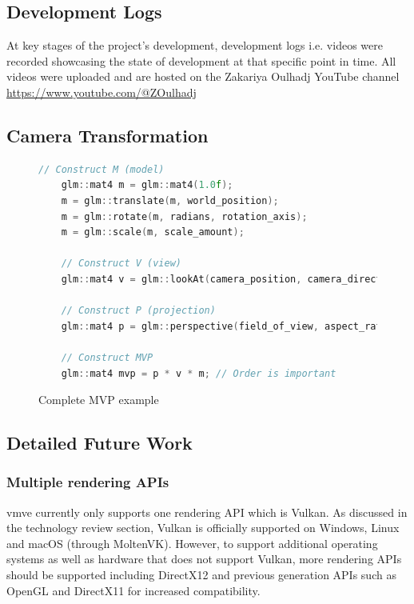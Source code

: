 \documentclass[11pt]{article}
\begin{document}
\subsection{Development Logs}
At key stages of the project's development, development logs i.e. videos were
recorded showcasing the state of development at that specific point in time. All
videos were uploaded and are hosted on the Zakariya Oulhadj YouTube channel
\url{https://www.youtube.com/@ZOulhadj}

\subsection{Camera Transformation}
\begin{figure}[H]
  \centering
  \begin{lstlisting}[language=C++]
    // Construct M (model)
    glm::mat4 m = glm::mat4(1.0f);
    m = glm::translate(m, world_position);   
    m = glm::rotate(m, radians, rotation_axis); 
    m = glm::scale(m, scale_amount);

    // Construct V (view)
    glm::mat4 v = glm::lookAt(camera_position, camera_direction, camera_up);

    // Construct P (projection)
    glm::mat4 p = glm::perspective(field_of_view, aspect_ratio, near, far);

    // Construct MVP
    glm::mat4 mvp = p * v * m; // Order is important

  \end{lstlisting}
  \caption{Complete MVP example}
  \label{fig:local_to_world_appendix}
\end{figure}

\subsection{Detailed Future Work} \label{detailed_future_work}

\subsubsection{Multiple rendering APIs}
\gls*{vmve} currently only supports one rendering API which is Vulkan. As
discussed in the technology review section, Vulkan is officially supported on
Windows, Linux and macOS (through MoltenVK). However, to support additional
operating systems as well as hardware that does not support Vulkan, more
rendering APIs should be supported including DirectX12 and previous generation
APIs such as OpenGL and DirectX11 for increased compatibility.
\end{document}
